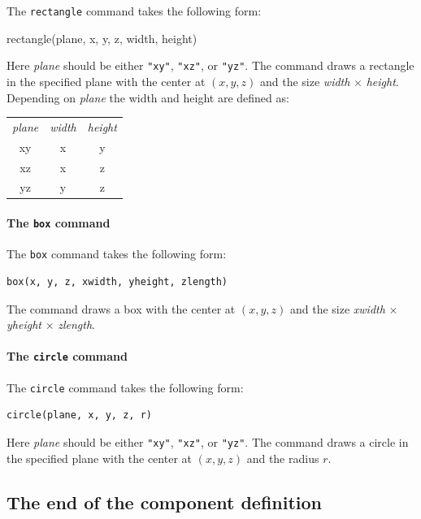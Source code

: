 The \texttt{rectangle} command takes the following form:
\begin{mcstas}
rectangle(plane, x, y, z, width, height)
\end{mcstas}
Here \textit{plane} should be either \verb+"xy"+, \verb+"xz"+, or
\verb+"yz"+. The command draws a rectangle in the specified plane with
the center at $(x, y, z)$ and the size \textit{width} $\times$
\textit{height}.
Depending on \textit{plane} the width and height are defined as:\\
\begin{tabular} {ccc}
  \textit{plane} & \textit{width} & \textit{height} \\
  xy & x & y \\
  xz & x & z \\
  yz & y & z \\
 \end{tabular}

\paragraph{The \texttt{box} command}

The \texttt{box} command takes the following form:
\begin{lstlisting}
box(x, y, z, xwidth, yheight, zlength)
\end{lstlisting}
The command draws a box with the center at $(x, y, z)$ and the size \textit{xwidth} $\times$ \textit{yheight} $\times$ \textit{zlength}.

\paragraph{The \texttt{circle} command}

The \texttt{circle} command takes the following form:
\begin{lstlisting}
circle(plane, x, y, z, r)
\end{lstlisting}
Here \textit{plane} should be either \verb+"xy"+, \verb+"xz"+, or
\verb+"yz"+. The command draws a circle in the specified plane with the center
 at $(x, y, z)$ and the radius $r$.



\subsection{The end of the component definition}

